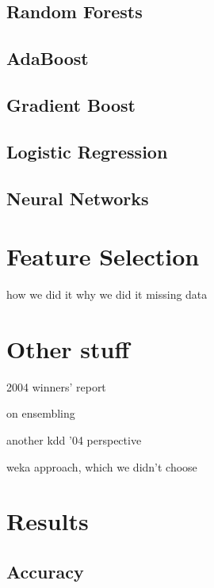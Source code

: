 \documentclass{article}
\begin{document}
\subsection{Random Forests}

\subsection{AdaBoost}

\subsection{Gradient Boost}

\subsection{Logistic Regression}

\subsection{Neural Networks}



\section{Feature Selection}
how we did it
why we did it
  missing data


\section{Other stuff}

2004 winners' report \cite{vogel2004anti}

on ensembling \cite{caruana2004ensemble}

another kdd '04 perspective \cite{caruana2004kdd}

weka approach, which we didn't choose \cite{pfahringer2004weka}


\section{Results}

\subsection{Accuracy}


\end{document}
